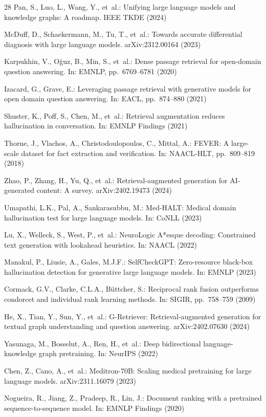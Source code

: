 \documentclass[runningheads]{llncs}
\begin{document}
\begin{thebibliography}{28}
Pan, S., Luo, L., Wang, Y., et~al.: Unifying large language models and knowledge graphs: A roadmap. IEEE TKDE (2024)

McDuff, D., Schaekermann, M., Tu, T., et~al.: Towards accurate differential diagnosis with large language models. arXiv:2312.00164 (2023)

Karpukhin, V., O\u{g}uz, B., Min, S., et~al.: Dense passage retrieval for open-domain question answering. In: EMNLP, pp.~6769--6781 (2020)

Izacard, G., Grave, E.: Leveraging passage retrieval with generative models for open domain question answering. In: EACL, pp.~874--880 (2021)

Shuster, K., Poff, S., Chen, M., et~al.: Retrieval augmentation reduces hallucination in conversation. In: EMNLP Findings (2021)

Thorne, J., Vlachos, A., Christodoulopoulos, C., Mittal, A.: FEVER: A large-scale dataset for fact extraction and verification. In: NAACL-HLT, pp.~809--819 (2018)

Zhao, P., Zhang, H., Yu, Q., et~al.: Retrieval-augmented generation for AI-generated content: A survey. arXiv:2402.19473 (2024)

Umapathi, L.K., Pal, A., Sankarasubbu, M.: Med-HALT: Medical domain hallucination test for large language models. In: CoNLL (2023)

Lu, X., Welleck, S., West, P., et~al.: NeuroLogic A*esque decoding: Constrained text generation with lookahead heuristics. In: NAACL (2022)

Manakul, P., Liusie, A., Gales, M.J.F.: SelfCheckGPT: Zero-resource black-box hallucination detection for generative large language models. In: EMNLP (2023)

Cormack, G.V., Clarke, C.L.A., B\"uttcher, S.: Reciprocal rank fusion outperforms condorcet and individual rank learning methods. In: SIGIR, pp.~758--759 (2009)

He, X., Tian, Y., Sun, Y., et~al.: G-Retriever: Retrieval-augmented generation for textual graph understanding and question answering. arXiv:2402.07630 (2024)

Yasunaga, M., Bosselut, A., Ren, H., et~al.: Deep bidirectional language-knowledge graph pretraining. In: NeurIPS (2022)

Chen, Z., Cano, A., et~al.: Meditron-70B: Scaling medical pretraining for large language models. arXiv:2311.16079 (2023)

Nogueira, R., Jiang, Z., Pradeep, R., Lin, J.: Document ranking with a pretrained sequence-to-sequence model. In: EMNLP Findings (2020)

\end{thebibliography}
\end{document}
